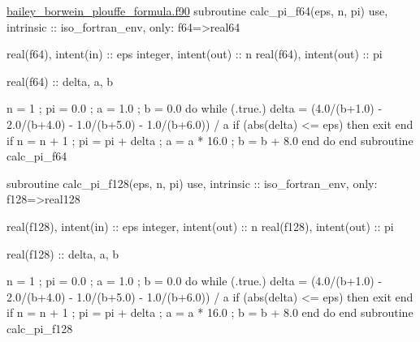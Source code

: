 \begin{fortran}[label={C:1-2}]{\href{https://github.com/iydon/CFDRust/blob/main/mae5005/code/1/bailey_borwein_plouffe_formula.f90}{bailey\_borwein\_plouffe\_formula.f90}}
subroutine calc_pi_f64(eps, n, pi)
   use, intrinsic :: iso_fortran_env, only: f64=>real64

   real(f64), intent(in) :: eps
   integer, intent(out) :: n
   real(f64), intent(out) :: pi

   real(f64) :: delta, a, b

   n = 1 ; pi = 0.0 ; a = 1.0 ; b = 0.0
   do while (.true.)
      delta = (4.0/(b+1.0) - 2.0/(b+4.0) - 1.0/(b+5.0) - 1.0/(b+6.0)) / a
      if (abs(delta) <= eps) then
         exit
      end if
      n = n + 1 ; pi = pi + delta ; a = a * 16.0 ; b = b + 8.0
   end do
end subroutine calc_pi_f64

subroutine calc_pi_f128(eps, n, pi)
   use, intrinsic :: iso_fortran_env, only: f128=>real128

   real(f128), intent(in) :: eps
   integer, intent(out) :: n
   real(f128), intent(out) :: pi

   real(f128) :: delta, a, b

   n = 1 ; pi = 0.0 ; a = 1.0 ; b = 0.0
   do while (.true.)
      delta = (4.0/(b+1.0) - 2.0/(b+4.0) - 1.0/(b+5.0) - 1.0/(b+6.0)) / a
      if (abs(delta) <= eps) then
         exit
      end if
      n = n + 1 ; pi = pi + delta ; a = a * 16.0 ; b = b + 8.0
   end do
end subroutine calc_pi_f128
\end{fortran}

